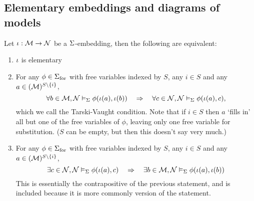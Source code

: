 \subsection{Elementary embeddings and diagrams of models}
\begin{prop}
    Let $\iota : \mathcal{M} \to \mathcal{N}$ be a $\Sigma$-embedding, 
    then the following are equivalent:
    \begin{enumerate}
        \item $\iota$ is elementary 
        \item For any 
            $\phi \in {\Sigma}_\mathrm{for}$ with free variables indexed by $S$,
            any $i \in S$ 
            and any $a \in ({\mathcal{M}})^{S \setminus \left\{i\right\}}$,
            \[\forall b \in {\mathcal{M}}, \mathcal{N} \vDash_{\Sigma} \phi(\iota(a),\iota(b)) 
            \quad \Rightarrow \quad 
            \forall c \in {\mathcal{N}}, \mathcal{N} \vDash_{\Sigma} \phi(\iota(a),c),\]
            which we call the Tarski-Vaught condition.
            Note that if $i \in S$ then 
            $a$ `fills in' all but one of the free variables of $\phi$, 
            leaving only one free variable for substitution.
            ($S$ can be empty, but then this doesn't say very much.)
        \item For any 
            $\phi \in {\Sigma}_\mathrm{for}$ with free variables indexed by $S$,
            any $i \in S$ 
            and any $a \in ({\mathcal{M}})^{S \setminus \left\{i\right\}}$,
            \[\exists c \in {\mathcal{N}}, \mathcal{N} \vDash_{\Sigma} \phi(\iota(a),c)
            \quad \Rightarrow \quad
            \exists b \in {\mathcal{M}}, \mathcal{N} \vDash_{\Sigma} \phi(\iota(a),\iota(b))\]
            This is essentially the contrapositive of the previous statement,
            and is included because it is more commonly 
            version of the statement.
    \end{enumerate}
\end{prop}
